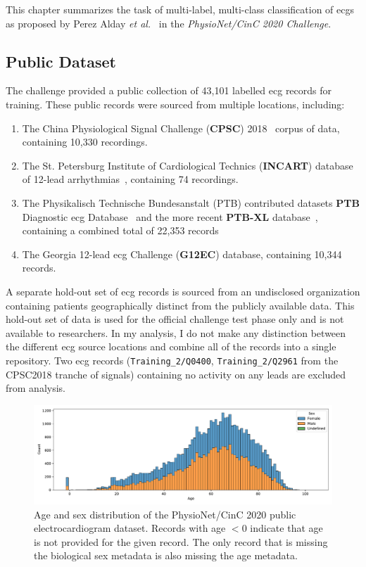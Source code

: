 \documentclass[\main/thesis.tex]{subfiles}
\begin{document}
This chapter summarizes the task of multi-label, multi-class classification of \gls{ecg}s as proposed by Perez Alday \emph{et al.}~\cite{physionet_challenge_2020} in the \emph{PhysioNet/CinC 2020 Challenge}.

\subsection{Public Dataset}
The challenge provided a public collection of 43,101 labelled \gls{ecg} records for training.
These public records were sourced from multiple locations, including:

\begin{enumerate}
    \item The China Physiological Signal Challenge (\textbf{CPSC}) 2018~\cite{liu_open_2018} corpus of data, containing 10,330 recordings.
    \item The St. Petersburg Institute of Cardiological Technics (\textbf{INCART}) database of 12-lead arrhythmias~\cite{tihonenko2008st}, containing 74 recordings.
    \item The Physikalisch Technische Bundesanstalt (PTB) contributed datasets \textbf{PTB} Diagnostic \gls{ecg} Database~\cite{NutzungderEKGSignaldatenbankCARDIODATderPTBberdasInternet} and the more recent \textbf{PTB-XL} database~\cite{wagner_ptb-xl_2020}, containing a combined total of 22,353 records
    \item The Georgia 12-lead \gls{ecg} Challenge (\textbf{G12EC}) database, containing 10,344 records.
\end{enumerate}

A separate hold-out set of \gls{ecg} records is sourced from an undisclosed organization containing patients geographically distinct from the publicly available data.
This hold-out set of data is used for the official challenge test phase only and is not available to researchers.
In my analysis, I do not make any distinction between the different \gls{ecg} source locations and combine all of the records into a single repository.
Two \gls{ecg} records (\texttt{Training\_2/Q0400}, \texttt{Training\_2/Q2961} from the CPSC2018 tranche of signals) containing no activity on any leads are excluded from analysis.

\begin{figure}[ht]
    \centering
    \includegraphics[width=14cm]{figure/age_sex_hist.pdf}
    \caption[Age and sex distribution of the PhysioNet/CinC 2020 public electrocardiogram dataset.]{Age and sex distribution of the PhysioNet/CinC 2020 public electrocardiogram dataset.
    Records with age $<0$ indicate that age is not provided for the given record. The only record that is missing the biological sex metadata is also missing the age metadata.}
    \label{fig:age_sex_hist}
\end{figure}
\end{document}
